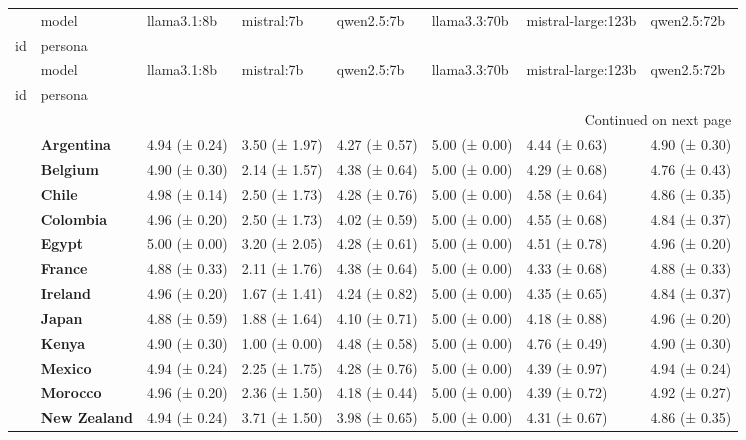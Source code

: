 \begin{longtable}{llllllll}
\toprule
 & model & llama3.1:8b & mistral:7b & qwen2.5:7b & llama3.3:70b & mistral-large:123b & qwen2.5:72b \\
id & persona &  &  &  &  &  &  \\
\midrule
\endfirsthead
\toprule
 & model & llama3.1:8b & mistral:7b & qwen2.5:7b & llama3.3:70b & mistral-large:123b & qwen2.5:72b \\
id & persona &  &  &  &  &  &  \\
\midrule
\endhead
\midrule
\multicolumn{8}{r}{Continued on next page} \\
\midrule
\endfoot
\bottomrule
\endlastfoot
\multirow[t]{19}{*}{\textbf{1}} & \textbf{Argentina} & 4.94 (± 0.24) & 3.50 (± 1.97) & 4.27 (± 0.57) & 5.00 (± 0.00) & 4.44 (± 0.63) & 4.90 (± 0.30) \\
\textbf{} & \textbf{Belgium} & 4.90 (± 0.30) & 2.14 (± 1.57) & 4.38 (± 0.64) & 5.00 (± 0.00) & 4.29 (± 0.68) & 4.76 (± 0.43) \\
\textbf{} & \textbf{Chile} & 4.98 (± 0.14) & 2.50 (± 1.73) & 4.28 (± 0.76) & 5.00 (± 0.00) & 4.58 (± 0.64) & 4.86 (± 0.35) \\
\textbf{} & \textbf{Colombia} & 4.96 (± 0.20) & 2.50 (± 1.73) & 4.02 (± 0.59) & 5.00 (± 0.00) & 4.55 (± 0.68) & 4.84 (± 0.37) \\
\textbf{} & \textbf{Egypt} & 5.00 (± 0.00) & 3.20 (± 2.05) & 4.28 (± 0.61) & 5.00 (± 0.00) & 4.51 (± 0.78) & 4.96 (± 0.20) \\
\textbf{} & \textbf{France} & 4.88 (± 0.33) & 2.11 (± 1.76) & 4.38 (± 0.64) & 5.00 (± 0.00) & 4.33 (± 0.68) & 4.88 (± 0.33) \\
\textbf{} & \textbf{Ireland} & 4.96 (± 0.20) & 1.67 (± 1.41) & 4.24 (± 0.82) & 5.00 (± 0.00) & 4.35 (± 0.65) & 4.84 (± 0.37) \\
\textbf{} & \textbf{Japan} & 4.88 (± 0.59) & 1.88 (± 1.64) & 4.10 (± 0.71) & 5.00 (± 0.00) & 4.18 (± 0.88) & 4.96 (± 0.20) \\
\textbf{} & \textbf{Kenya} & 4.90 (± 0.30) & 1.00 (± 0.00) & 4.48 (± 0.58) & 5.00 (± 0.00) & 4.76 (± 0.49) & 4.90 (± 0.30) \\
\textbf{} & \textbf{Mexico} & 4.94 (± 0.24) & 2.25 (± 1.75) & 4.28 (± 0.76) & 5.00 (± 0.00) & 4.39 (± 0.97) & 4.94 (± 0.24) \\
\textbf{} & \textbf{Morocco} & 4.96 (± 0.20) & 2.36 (± 1.50) & 4.18 (± 0.44) & 5.00 (± 0.00) & 4.39 (± 0.72) & 4.92 (± 0.27) \\
\textbf{} & \textbf{New Zealand} & 4.94 (± 0.24) & 3.71 (± 1.50) & 3.98 (± 0.65) & 5.00 (± 0.00) & 4.31 (± 0.67) & 4.86 (± 0.35) \\

\end{longtable}
